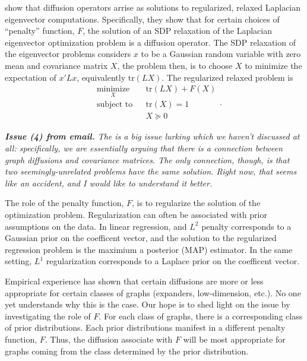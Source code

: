 \documentclass{article}
\begin{document}
\cite{mahoney2010implementing} show that diffusion operators arrise as solutions to regularized, relaxed Laplacian eigenvector computations.  Specifically, they show that for certain choices of ``penalty'' function, $F$, the solution of an SDP relaxation of the Laplacian eigenvector optimization problem is a diffusion operator.  The SDP relaxation of the eigenvector problems considers $x$ to be a Gaussian random variable with zero mean and covariance matrix $X$, the problem then, is to choose $X$ to minimize the expectation of $x' L x$, equivalently $\mathrm{tr}(L X)$.  The regularized relaxed problem is
\[
\begin{aligned}
  & \underset{X}{\text{minimize}}
  & & \mathrm{tr}(LX) + F(X) \\
  & \text{subject to}
  & & \mathrm{tr}(X) = 1 \\
  & & & X \succeq 0
\end{aligned}.
\]

\textit{\textbf{Issue (4) from email.} The is a big issue lurking which we haven't discussed at all: specifically, we are essentially arguing that there is a connection between graph diffusions and covariance matrices.  The only connection, though, is that two seemingly-unrelated problems have the same solution.  Right now, that seems like an accident, and I would like to understand it better.}

The role of the penalty function, $F$, is to regularize the solution of the optimization problem.  Regularization can often be associated with prior assumptions on the data.  In linear regression, and $L^2$ penalty corresponds to a Gaussian prior on the coefficent vector, and the solution to the regularized regression problem is the maximium a posterior (MAP) estimator.  In the same setting, $L^1$ regularization corresponds to a Laplace prior on the coefficent vector.

Empirical experience has shown that certain diffusions are more or less appropriate for certain classes of graphs (expanders, low-dimension, etc.).  No one yet understands why this is the case.  Our hope is to shed light on the issue by investigating the role of $F$.  For each class of graphs, there is a corresponding class of prior distributions.  Each prior distributions manifest in a different penalty function, $F$.  Thus, the diffusion associate with $F$ will be most appropriate for graphs coming from the class determined by the prior distribution.




\end{document}
